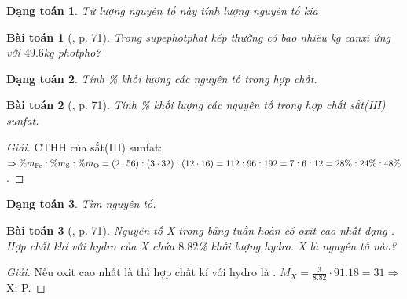 \documentclass{article}
\newtheorem{baitoan}{Bài toán}
\newtheorem{dangtoan}{Dạng toán}
\begin{document}
\begin{dangtoan}
	Từ lượng nguyên tố này tính lượng nguyên tố kia
\end{dangtoan}

\begin{baitoan}[\cite{Tuan2022}, p. 71]
	Trong supephotphat kép thường có bao nhiêu kg canxi ứng với $49.6$\emph{kg} photpho?
\end{baitoan}

\begin{dangtoan}
	Tính \% khối lượng các nguyên tố trong hợp chất.
\end{dangtoan}

\begin{baitoan}[\cite{Tuan2022}, p. 71]
	Tính \% khối lượng các nguyên tố trong hợp chất sắt(III) sunfat.
\end{baitoan}

\begin{proof}[Giải]
	CTHH của sắt(III) sunfat: $\Rightarrow\%m_{\ce{Fe}}:\%m_{\ce{S}}:\%m_{\ce{O}} = (2\cdot56):(3\cdot32):(12\cdot16) = 112:96:192 = 7:6:12 = 28\%:24\%:48\%$.
\end{proof}

\begin{dangtoan}
	Tìm nguyên tố.
\end{dangtoan}

\begin{baitoan}[\cite{Tuan2022}, p. 71]
	Nguyên tố X trong bảng tuần hoàn có oxit cao nhất dạng \emph{}. Hợp chất khí với hydro của X chứa $8.82$\% khối lượng hydro. X là nguyên tố nào?
\end{baitoan}

\begin{proof}[Giải]
	Nếu oxit cao nhất là  thì hợp chất kí với hydro là . $M_X = \frac{3}{8.82}\cdot91.18 = 31\Rightarrow$ X: P.
\end{proof}



\printbibliography[heading=bibintoc]
	
\end{document}
